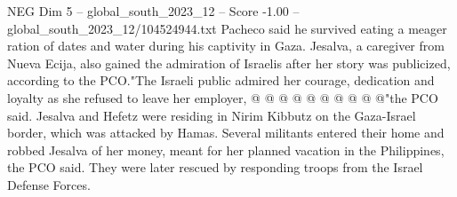 \begin{textsample}{NEG Dim 5 – global\_south\_2023\_12 – Score -1.00 – global\_south\_2023\_12/104524944.txt}
Pacheco said he survived eating a meager ration of dates and water during his captivity in Gaza.
Jesalva, a caregiver from Nueva Ecija, also gained the admiration of Israelis after her story was publicized, according to the PCO."The Israeli public admired her courage, dedication and loyalty as she refused to leave her employer, @ @ @ @ @ @ @ @ @ @"the PCO said.
Jesalva and Hefetz were residing in Nirim Kibbutz on the Gaza-Israel border, which was attacked by Hamas.
Several militants entered their home and robbed Jesalva of her money, meant for her planned vacation in the Philippines, the PCO said.
They were later rescued by responding troops from the Israel Defense Forces.

\end{textsample}
